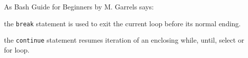 As Bash Guide for Beginners by M. Garrels says:
\begin{compactenum}
\item the \texttt{break} statement is used to
exit the current loop before its normal ending.
\item the \texttt{continue} statement resumes iteration
of an enclosing while, until, select or for loop.
\end{compactenum}

\vfill\null
\columnbreak



